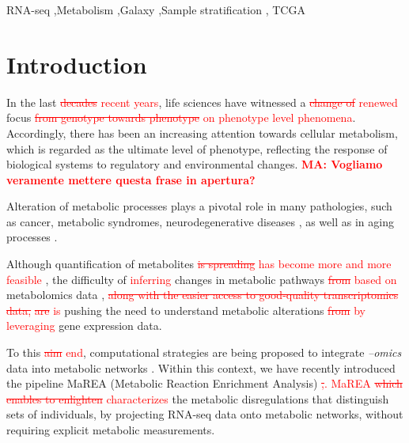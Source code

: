 \documentclass[preprint,12pt,authoryear]{elsarticle}
\newcommand{\red}{\textcolor{red}}
\newcommand{\mareaTool}{\textsf{MaREA}}
\begin{document}
\begin{frontmatter}
  \begin{keyword}
    RNA-seq \sep Metabolism \sep Galaxy \sep Sample stratification \sep
    TCGA



  \end{keyword}

\end{frontmatter}




\section{Introduction}

In the last \red{\sout{decades} recent years}, life sciences have
witnessed a \red{\sout{change of} renewed} focus
\red{\sout{from genotype towards phenotype} on phenotype level phenomena}. Accordingly, there has been an
increasing attention towards cellular metabolism, which is regarded as
the ultimate level of phenotype, reflecting the response of biological
systems to regulatory and environmental changes. \red{\bfseries MA:
  Vogliamo veramente mettere questa frase in apertura?}

Alteration of metabolic processes plays a pivotal role in many
pathologies, such as cancer, metabolic syndromes, neurodegenerative
diseases \citep{hotamisligil2006inflammation,ward2012metabolic}, as
well as in aging processes \citep{lopez2016metabolic}.

Although quantification of metabolites \red{\sout{is spreading} has
  become more and more feasible}
\citep{Holmes2008}, the difficulty of \textcolor{red}{inferring}
changes in metabolic pathways \red{\sout{from} based on} metabolomics data
\citep{damiani2016linking},
%
\red{\sout{along with the easier access to
    good-quality transcriptomics data,}}
%
\red{\sout{are} is} pushing the need to understand
metabolic alterations \red{\sout{from} by leveraging} gene expression
data.

To this \red{\sout{aim} end}, computational strategies are being
proposed to integrate \textit{--omics} data into metabolic networks
\citep{machado2014systematic,yizhak2015modeling,opdam2017systematic}. Within
this context, we have recently introduced the pipeline
\mareaTool{} %
(Metabolic Reaction Enrichment Analysis) \citep{marea}
%
\red{\sout{,}. \mareaTool{} \sout{which enables to enlighten}
  characterizes} the metabolic disregulations that distinguish sets of
individuals, by projecting RNA-seq data onto metabolic networks,
without requiring explicit metabolic measurements.
\end{document}
